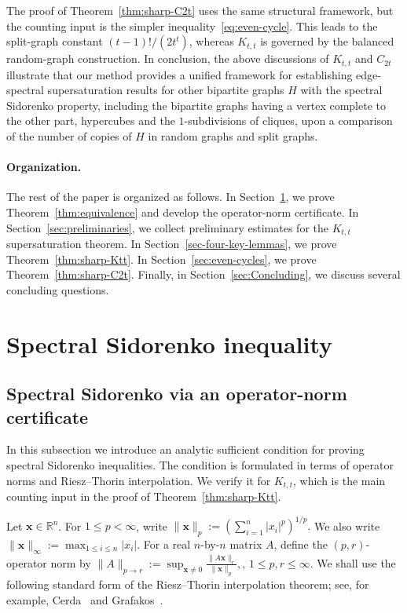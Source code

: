 \documentclass[10pt,a4paper]{amsart}
\begin{document}
The proof of Theorem~\ref{thm:sharp-C2t} uses the same structural
framework, but the counting input is the simpler inequality~\eqref{eq:even-cycle}.
This leads to the split-graph constant \((t-1)!/(2t^t)\), whereas
\(K_{t,t}\) is governed by the balanced random-graph construction. In conclusion, the above discussions of $K_{t,t}$ and $C_{2t}$ illustrate that 
our method provides a unified framework for  establishing edge-spectral supersaturation
results for other bipartite graphs $H$ with the spectral Sidorenko property, including the bipartite graphs having a vertex complete to the other part, hypercubes and the $1$-subdivisions of cliques, upon a comparison of the number of  copies of $H$ in random graphs and split graphs. 

\paragraph{Organization.}

The rest of the paper is organized as follows.  In
Section~\ref{sec:proof-spectral-Sido}, we prove
Theorem~\ref{thm:equivalence} and develop the operator-norm certificate.
In Section~\ref{sec:preliminaries}, we collect preliminary estimates for
the \(K_{t,t}\) supersaturation theorem.  In
Section~\ref{sec-four-key-lemmas}, we prove Theorem~\ref{thm:sharp-Ktt}.
In Section~\ref{sec:even-cycles}, we prove Theorem~\ref{thm:sharp-C2t}.
Finally, in Section~\ref{sec:Concluding}, we discuss several concluding
questions.


\section{Spectral Sidorenko inequality}\label{sec:proof-spectral-Sido}

\subsection{Spectral Sidorenko via an operator-norm certificate}

In this subsection we introduce an analytic sufficient condition for
proving spectral Sidorenko inequalities.  The condition is formulated in
terms of operator norms and Riesz--Thorin interpolation.
We verify it for \(K_{t,t}\), which is the main counting input in the proof of Theorem~\ref{thm:sharp-Ktt}.

Let \(\bm{x}\in\mathbb R^n\).  For \(1\le p<\infty\), write
        $\|\bm{x}\|_p
        :=
        \left(\sum_{i=1}^n |x_i|^p\right)^{1/p}.$
We also write
        $\|\bm{x}\|_\infty:=\max_{1\le i\le n}|x_i|.$ For a real
\(n\)-by-\(n\) matrix \(A\), define the \((p,r)\)-operator norm by $ \|A\|_{p\to r}
        :=
        \sup_{\bm{x}\neq 0}
        \frac{\|A\bm{x}\|_r}{\|\bm{x}\|_p},
$, $1\le p,r\le\infty$.
We shall use the following standard form of the Riesz--Thorin
interpolation theorem; see, for example,
Cerda~\cite[page~61]{Cerda2010linear} and
Grafakos~\cite[page~37]{Grafakos2014ClassicalFourierAnalysis}.
\end{document}

